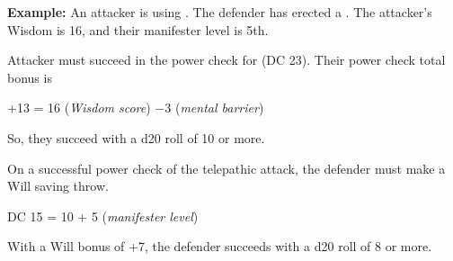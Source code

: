 \textbf{Example:} An attacker is using . The defender has erected a . The attacker's Wisdom is 16, and their manifester level is 5th.
\begin{enumerate*}
	\item Attacker must succeed in the power check for  (DC 23). Their power check total bonus is

	\begin{Formula}{+13 = 16 (\textit{Wisdom score}) $-3$ (\textit{mental barrier})}\end{Formula}

	So, they succeed with a d20 roll of 10 or more.


	\item On a successful power check of the telepathic attack, the defender must make a Will saving throw.

	\begin{Formula}{DC 15 = 10 + 5 (\textit{manifester level})}\end{Formula}

	With a Will bonus of +7, the defender succeeds with a d20 roll of 8 or more.
\end{enumerate*}
